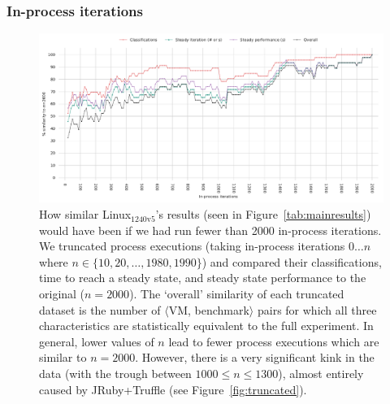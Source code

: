 \documentclass[acmsmall,screen]{acmart}
\newcommand{\bencherseven}{Linux$_\mathrm{1240v5}$\xspace}
\newcommand{\vmbpair}{$\langle$VM, benchmark$\rangle$\xspace}
\newcommand{\numiterations}{2000\xspace}
\begin{document}
\subsubsection{In-process iterations}

\begin{figure}[!tbp]
\centering
\includegraphics[width=\textwidth]{examples/truncated_same_plot.pdf}
\caption{How similar \bencherseven's results (seen in Figure~\ref{tab:mainresults})
would have been if we had run fewer than
\numiterations in-process iterations. We truncated process executions (taking in-process
iterations $0 \ldots n$ where $n \in \{10, 20, \ldots, 1980, 1990\}$) and compared
their classifications, time to reach a steady state, and steady state
performance to the original ($n=2000$). The `overall' similarity of each truncated
dataset is the number of \vmbpair pairs for which all three characteristics are statistically
equivalent to the full experiment.
In general, lower values of $n$ lead to fewer process executions
which are similar to $n=2000$. However, there is a very significant kink in the
data (with the trough between $1000 \leq n \leq 1300$), almost entirely caused by JRuby+Truffle (see
Figure~\ref{fig:truncated}).}
\label{fig:sametruncated}
\end{figure}
\end{document}
